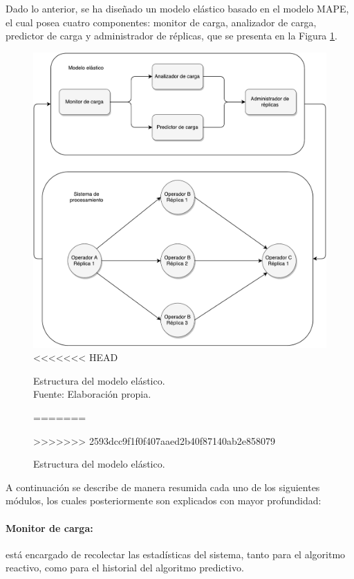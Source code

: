 Dado lo anterior, se ha dise\~nado un modelo el\'astico \normalsize{basado en el modelo MAPE}\citep{redbooks2004practical}\normalsize{, el cual posea cuatro componentes}: monitor de carga, analizador de carga, predictor de carga y administrador de r\'eplicas, que se presenta en la Figura \ref{fig:componentesSistemas}.

\begin{figure}[ht!]
  \centering
    \includegraphics[scale=0.5]{images/Diagrama.pdf}
<<<<<<< HEAD
  \caption[Estructura del modelo elástico.]{Estructura del modelo elástico.\\Fuente: Elaboración propia.}
=======
  \caption{Estructura del modelo el\'astico.}
>>>>>>> 2593dcc9f1f0f407aaed2b40f87140ab2e858079
  \label{fig:componentesSistemas}
\end{figure}

A continuaci\'on se describe de manera resumida cada uno de los siguientes m\'odulos, los cuales posteriormente son explicados con mayor profundidad:

\paragraph{Monitor de carga:} est\'a encargado de recolectar las estad\'isticas del sistema, tanto para el algoritmo reactivo, como para el historial del algoritmo predictivo.

